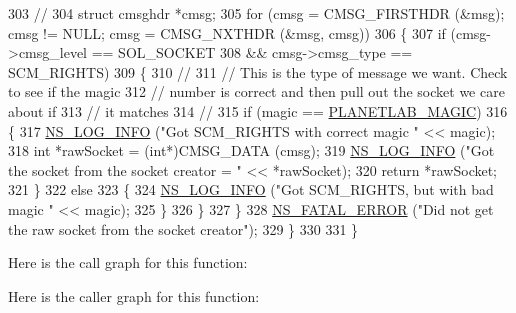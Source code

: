 \begin{DoxyCode}
303       \textcolor{comment}{//}
304       \textcolor{keyword}{struct }cmsghdr *cmsg;
305       \textcolor{keywordflow}{for} (cmsg = CMSG\_FIRSTHDR (&msg); cmsg != NULL; cmsg = CMSG\_NXTHDR (&msg, cmsg))
306         \{
307           \textcolor{keywordflow}{if} (cmsg->cmsg\_level == SOL\_SOCKET
308               && cmsg->cmsg\_type == SCM\_RIGHTS)
309             \{
310               \textcolor{comment}{//}
311               \textcolor{comment}{// This is the type of message we want.  Check to see if the magic}
312               \textcolor{comment}{// number is correct and then pull out the socket we care about if}
313               \textcolor{comment}{// it matches}
314               \textcolor{comment}{//}
315               \textcolor{keywordflow}{if} (magic == \hyperlink{planetlab-fd-net-device-helper_8cc_a15008ade4323f5ef598ad5a66b141e42}{PLANETLAB\_MAGIC})
316                 \{
317                   \hyperlink{group__logging_gafbd73ee2cf9f26b319f49086d8e860fb}{NS\_LOG\_INFO} (\textcolor{stringliteral}{"Got SCM\_RIGHTS with correct magic "} << magic);
318                   \textcolor{keywordtype}{int} *rawSocket = (\textcolor{keywordtype}{int}*)CMSG\_DATA (cmsg);
319                   \hyperlink{group__logging_gafbd73ee2cf9f26b319f49086d8e860fb}{NS\_LOG\_INFO} (\textcolor{stringliteral}{"Got the socket from the socket creator = "} << *rawSocket);
320                   \textcolor{keywordflow}{return} *rawSocket;
321                 \}
322               \textcolor{keywordflow}{else}
323                 \{
324                   \hyperlink{group__logging_gafbd73ee2cf9f26b319f49086d8e860fb}{NS\_LOG\_INFO} (\textcolor{stringliteral}{"Got SCM\_RIGHTS, but with bad magic "} << magic);
325                 \}
326             \}
327         \}
328       \hyperlink{group__fatal_ga5131d5e3f75d7d4cbfd706ac456fdc85}{NS\_FATAL\_ERROR} (\textcolor{stringliteral}{"Did not get the raw socket from the socket creator"});
329     \}
330 
331 \}
\end{DoxyCode}


Here is the call graph for this function\+:




Here is the caller graph for this function\+:


